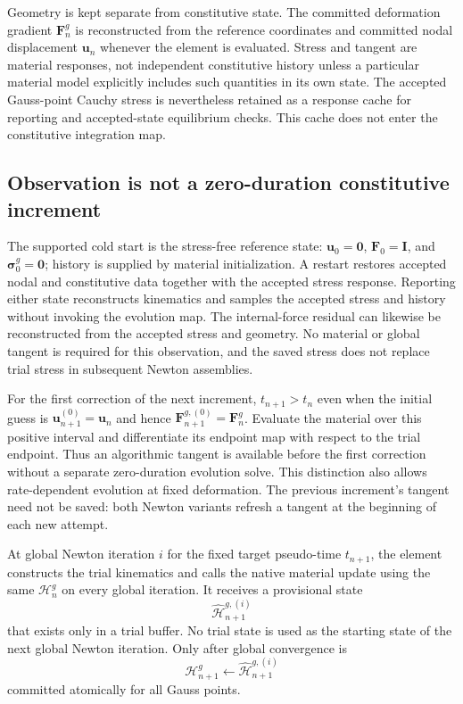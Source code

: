 \documentclass[11pt,a4paper]{article}
\newcommand{\bs}[1]{\boldsymbol{#1}}
\newcommand{\F}{\bs{F}}
\newcommand{\sig}{\bs{\sigma}}
\newcommand{\vct}[1]{\mathbf{#1}}
\begin{document}
Geometry is kept separate from constitutive state. The committed deformation gradient $\F_n^g$ is reconstructed from the reference coordinates and committed nodal displacement $\vct u_n$ whenever the element is evaluated. Stress and tangent are material responses, not independent constitutive history unless a particular material model explicitly includes such quantities in its own state. The accepted Gauss-point Cauchy stress is nevertheless retained as a response cache for reporting and accepted-state equilibrium checks. This cache does not enter the constitutive integration map.

\subsection{Observation is not a zero-duration constitutive increment}

The supported cold start is the stress-free reference state: $\vct u_0=\vct0$, $\F_0=\bs I$, and $\sig_0^g=\bs0$;
history is supplied by material initialization. A restart restores accepted nodal and constitutive data together
with the accepted stress response. Reporting either state reconstructs kinematics and samples the accepted stress
and history without invoking the evolution map. The internal-force residual can likewise be reconstructed from
the accepted stress and geometry. No material or global tangent is required for this observation, and the saved
stress does not replace trial stress in subsequent Newton assemblies.

For the first correction of the next increment, $t_{n+1}>t_n$ even when the initial guess is
$\vct u_{n+1}^{(0)}=\vct u_n$ and hence $\F_{n+1}^{g,(0)}=\F_n^g$. Evaluate the material over this positive
interval and differentiate its endpoint map with respect to the trial endpoint. Thus an algorithmic tangent is
available before the first correction without a separate zero-duration evolution solve. This distinction also
allows rate-dependent evolution at fixed deformation. The previous increment's tangent need not be saved: both
Newton variants refresh a tangent at the beginning of each new attempt.

At global Newton iteration $i$ for the fixed target pseudo-time $t_{n+1}$, the element constructs the trial kinematics and calls the native material update using the same $\mathcal H_n^g$ on every global iteration. It receives a provisional state
\begin{equation}
\widehat{\mathcal H}_{n+1}^{g,(i)}
\end{equation}
that exists only in a trial buffer. No trial state is used as the starting state of the next global Newton iteration. Only after global convergence is
\begin{equation}
\mathcal H_{n+1}^g
\leftarrow
\widehat{\mathcal H}_{n+1}^{g,(i)}
\end{equation}
committed atomically for all Gauss points.
\end{document}
